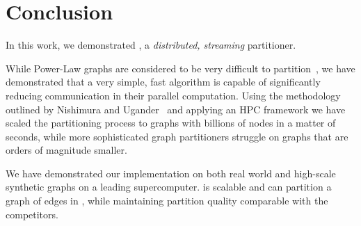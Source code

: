 \section{Conclusion} \label{sec:conc}
In this work, we demonstrated \ourmethod, a \emph{distributed, streaming} partitioner. 

While Power-Law graphs are considered to be very difficult to partition~\cite{Abou-Rjeili:2006:MAP:1898953.1899055}, we have demonstrated that a very simple, fast algorithm is capable of significantly reducing communication in their parallel computation. Using the methodology outlined by Nishimura and Ugander~\cite{nishimura2013restream} and applying an HPC framework we have scaled the partitioning process to graphs with billions of nodes in a matter of seconds, while more sophisticated graph partitioners struggle on graphs that are orders of magnitude smaller.

We have demonstrated our implementation on both real world and high-scale synthetic graphs on a leading supercomputer. \ourmethod is scalable and can partition a graph of \largestgraphedges edges in \largestgraphtime, while maintaining partition quality comparable with the competitors. 
